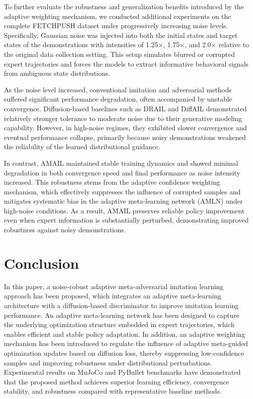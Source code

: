 \documentclass[journal]{IEEEtran}
\begin{document}
To further evaluate the robustness and generalization benefits introduced by the adaptive weighting mechanism, we conducted additional experiments on the complete FETCHPUSH dataset under progressively increasing noise levels. Specifically, Gaussian noise was injected into both the initial states and target states of the demonstrations with intensities of 1.25$\times$, 1.75$\times$, and 2.0$\times$ relative to the original data collection setting. This setup simulates blurred or corrupted expert trajectories and forces the models to extract informative behavioral signals from ambiguous state distributions.

As the noise level increased, conventional imitation and adversarial methods suffered significant performance degradation, often accompanied by unstable convergence. Diffusion-based baselines such as DRAIL and DiffAIL demonstrated relatively stronger tolerance to moderate noise due to their generative modeling capability. However, in high-noise regimes, they exhibited slower convergence and eventual performance collapse, primarily because noisy demonstrations weakened the reliability of the learned distributional guidance.

In contrast, AMAIL maintained stable training dynamics and showed minimal degradation in both convergence speed and final performance as noise intensity increased. This robustness stems from the adaptive confidence weighting mechanism, which effectively suppresses the influence of corrupted samples and mitigates systematic bias in the adaptive meta-learning network (AMLN) under high-noise conditions. As a result, AMAIL preserves reliable policy improvement even when expert information is substantially perturbed, demonstrating improved robustness against noisy demonstrations.



\section{Conclusion}
In this paper, a noise-robust adaptive meta-adversarial imitation learning approach has been proposed, which integrates an adaptive meta-learning architecture with a diffusion-based discriminator to improve imitation learning performance.
An adaptive meta-learning network has been designed to capture the underlying optimization structure embedded in expert trajectories, which enables efficient and stable policy adaptation. In addition, an adaptive weighting mechanism has been introduced to regulate the influence of adaptive meta-guided optimization updates based on diffusion loss, thereby suppressing low-confidence samples and improving robustness under distributional perturbations.
Experimental results on MuJoCo and PyBullet benchmarks have demonstrated that the proposed method achieves superior learning efficiency, convergence stability, and robustness compared with representative baseline methods. 
\end{document}
